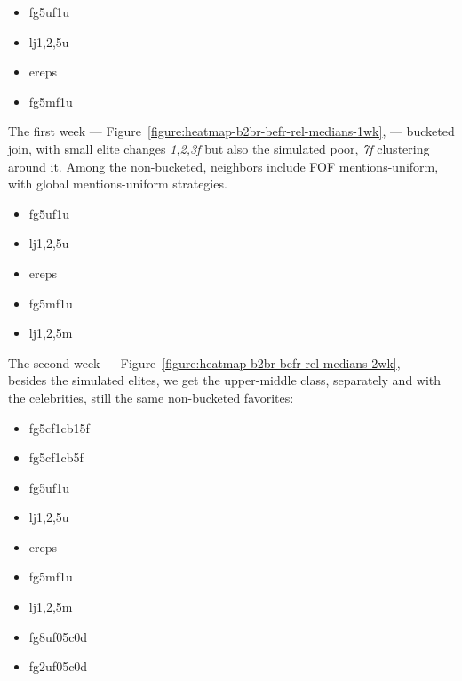 \documentclass[10pt,oneside]{memoir}
\begin{document}
\begin{itemize}


\item fg5uf1u

\item lj{1,2,5}u

\item ereps

\item fg5mf1u
\end{itemize}

The first week --- Figure~\ref{figure:heatmap-b2br-befr-rel-medians-1wk}, ---  bucketed join, with small elite changes {\itshape {1,2,3}f} but also the simulated poor, {\itshape 7f} clustering around it.  Among the non-bucketed, neighbors include FOF mentions-uniform, with global mentions-uniform strategies.


\begin{itemize}


\item fg5uf1u

\item lj{1,2,5}u

\item ereps

\item fg5mf1u

\item lj{1,2,5}m
\end{itemize}

The second week --- Figure~\ref{figure:heatmap-b2br-befr-rel-medians-2wk}, ---  besides the simulated elites, we get the upper-middle class, separately and with the celebrities, still the same non-bucketed favorites:


\begin{itemize}


\item fg5cf1cb15f

\item fg5cf1cb5f

\item fg5uf1u

\item lj{1,2,5}u

\item ereps

\item fg5mf1u

\item lj{1,2,5}m

\item fg8uf05c0d

\item fg2uf05c0d
\end{itemize}
\end{document}
